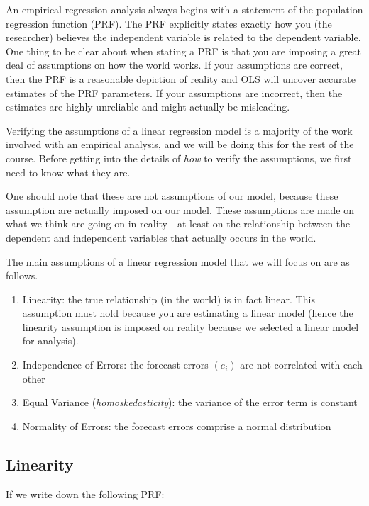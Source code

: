 \documentclass[
]{book}
\begin{document}
An empirical regression analysis always begins with a statement of the population regression function (PRF). The PRF explicitly states exactly how you (the researcher) believes the independent variable is related to the dependent variable. One thing to be clear about when stating a PRF is that you are imposing a great deal of assumptions on how the world works. If your assumptions are correct, then the PRF is a reasonable depiction of reality and OLS will uncover accurate estimates of the PRF parameters. If your assumptions are incorrect, then the estimates are highly unreliable and might actually be misleading.

Verifying the assumptions of a linear regression model is a majority of the work involved with an empirical analysis, and we will be doing this for the rest of the course. Before getting into the details of \emph{how} to verify the assumptions, we first need to know what they are.

One should note that these are not assumptions of our model, because these assumption are actually imposed on our model. These assumptions are made on what we think are going on in reality - at least on the relationship between the dependent and independent variables that actually occurs in the world.

The main assumptions of a linear regression model that we will focus on are as follows.

\begin{enumerate}
\def\labelenumi{\arabic{enumi}.}
\item
  Linearity: the true relationship (in the world) is in fact linear. This assumption must hold because you are estimating a linear model (hence the linearity assumption is imposed on reality because we selected a linear model for analysis).
\item
  Independence of Errors: the forecast errors \((e_i)\) are not correlated with each other
\item
  Equal Variance (\emph{homoskedasticity}): the variance of the error term is constant
\item
  Normality of Errors: the forecast errors comprise a normal distribution
\end{enumerate}

\hypertarget{linearity}{%
\subsection{Linearity}\label{linearity}}

If we write down the following PRF:
\end{document}
